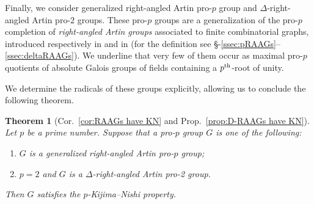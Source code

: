 \documentclass{amsart}
\newtheorem{mainthm}{Theorem}
\theoremstyle{definition}
\theoremstyle{remark}
\newcommand{\pth}{{p^{\rm th}}}
\begin{document}
Finally, we consider generalized right-angled Artin pro-$p$ group and $\Delta$-right-angled Artin pro-$2$ groups. These pro-$p$ groups are a generalization of the pro-$p$ completion of {\sl right-angled Artin groups} associated to finite combinatorial graphs, introduced respectively in \cite{quadrelliQuadraticCoho} and in \cite{deltaRAAGs} (for the definition see \S-\ref{ssec:pRAAGs}--\ref{ssec:deltaRAAGs}).
We underline that very few of them occur as maximal pro-$p$ quotients of absolute Galois groups of fields containing a $\pth$-root of unity.

We determine the radicals of these groups explicitly, allowing us to conclude the following theorem.
\begin{mainthm}[Cor.~\ref{cor:RAAGs have KN} and Prop.~\ref{prop:D-RAAGs have KN}]\label{thm:RAAGs and action}
Let $p$ be a prime number.
Suppose that a pro-$p$ group $G$ is one of the following:
\begin{enumerate}[label=(\roman*)]
    \item $G$ is a generalized right-angled Artin pro-$p$ group;
    \item $p=2$ and $G$ is a $\Delta$-right-angled Artin pro-2 group.
\end{enumerate}
Then $G$ satisfies the $p$-Kijima--Nishi property.
\end{mainthm}
\end{document}
